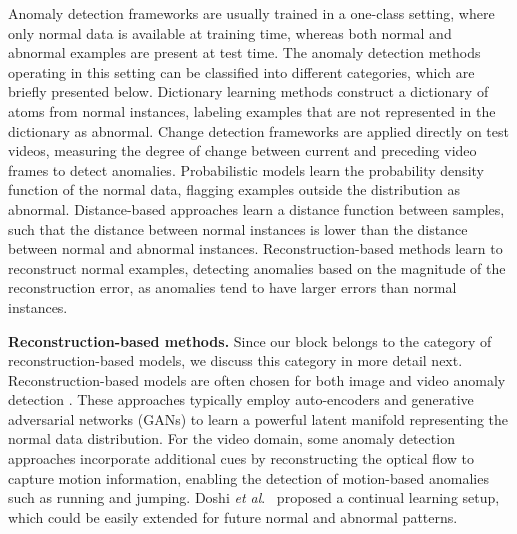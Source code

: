 \documentclass[10pt,journal,compsoc]{IEEEtran}
\newcommand{\etal}{\textit{et al}.}
\begin{document}
Anomaly detection frameworks are usually trained in a one-class setting, where only normal data is available at training time, whereas both normal and abnormal examples are present at test time. The anomaly detection methods operating in this setting can be classified into different categories, which are briefly presented below. Dictionary learning methods \cite{Carrera-TII-2017,Cheng-CVPR-2015,Cong-CVPR-2011,Dutta-AAAI-2015,Lu-ICCV-2013,Ren-BMVC-2015} construct a dictionary of atoms from normal instances, labeling examples that are not represented in the dictionary as abnormal. Change detection frameworks \cite{Giorno-ECCV-2016,Ionescu-ICCV-2017,Liu-BMVC-2018,Pang-CVPR-2020} are applied directly on test videos, measuring the degree of change between current and preceding video frames to detect anomalies. Probabilistic models \cite{Adam-PAMI-2008,Antic-ICCV-2011,Feng-NC-2017,Hinami-ICCV-2017,Kim-CVPR-2009,Mahadevan-CVPR-2010,Mehran-CVPR-2009,Rudolph-WACV-2021,Saleh-CVPR-2013,Wu-CVPR-2010} learn the probability density function of the normal data, flagging examples outside the distribution as abnormal. Distance-based approaches \cite{Bergmann-CVPR-2020,Defard-ICPR-2021,Ionescu-CVPR-2019,Ionescu-WACV-2019,Ramachandra-WACV-2020a,Ramachandra-WACV-2020b,Ravanbakhsh-WACV-2018,Sabokrou-IP-2017,Sabokrou-CVIU-2018,Saligrama-CVPR-2012,Smeureanu-ICIAP-2017,Sun-PR-2017,Tran-BMVC-2017,Roth-CVPR-2022} learn a distance function between samples, such that the distance between normal instances is lower than the distance between normal and abnormal instances. Reconstruction-based methods \cite{Fei-TMM-2020,Gong-ICCV-2019,Hasan-CVPR-2016,Li-BMVC-2020,Liu-CVPR-2018,Luo-ICCV-2017,Nguyen-ICCV-2019,Park-CVPR-2020,Ravanbakhsh-ICIP-2017,Salehi-CVPR-2021,Tang-PRL-2020,Venkataramanan-ECCV-2020, Zavrtanik-ICCV-2021,Yamada-IROS-2022} learn to reconstruct normal examples, detecting anomalies based on the magnitude of the reconstruction error, as anomalies tend to have larger errors than normal instances. 

\noindent
\textbf{Reconstruction-based methods.} 
Since our block belongs to the category of reconstruction-based models, we discuss this category in more detail next.
Reconstruction-based models are often chosen for both image and video anomaly detection \cite{Zavrtanik-ICCV-2021, Georgescu-CVPR-2021, Park-CVPR-2020, Liu-ICCV-2021}. These approaches typically employ auto-encoders and generative adversarial networks (GANs) to learn a powerful latent manifold representing the normal data distribution. For the video domain, some anomaly detection approaches \cite{Liu-ICCV-2021, Ionescu-CVPR-2019, Liu-CVPR-2018} incorporate additional cues by reconstructing the optical flow to capture motion information, enabling the detection of motion-based anomalies such as running and jumping. Doshi \etal~\cite{Doshi-WACV-2022} proposed a continual learning setup, which could be easily extended for future normal and abnormal patterns.  
\end{document}
